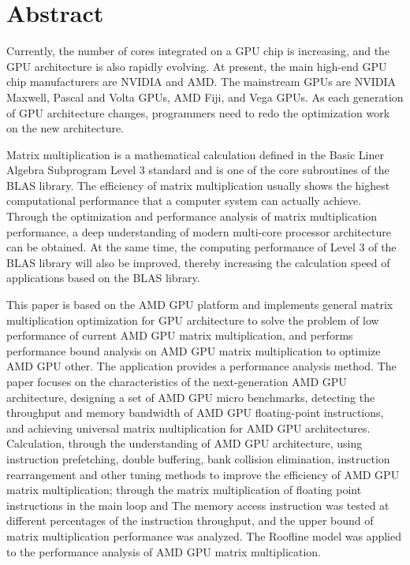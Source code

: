 \chapter*{Abstract}%

Currently, the number of cores integrated on a GPU chip is increasing, and the GPU architecture is also rapidly evolving. At present, the main high-end GPU chip manufacturers are NVIDIA and AMD. The mainstream GPUs are NVIDIA Maxwell, Pascal and Volta GPUs, AMD Fiji, and Vega GPUs. As each generation of GPU architecture changes, programmers need to redo the optimization work on the new architecture.

Matrix multiplication is a mathematical calculation defined in the Basic Liner Algebra Subprogram Level 3 standard and is one of the core subroutines of the BLAS library. The efficiency of matrix multiplication usually shows the highest computational performance that a computer system can actually achieve. Through the optimization and performance analysis of matrix multiplication performance, a deep understanding of modern multi-core processor architecture can be obtained. At the same time, the computing performance of Level 3 of the BLAS library will also be improved, thereby increasing the calculation speed of applications based on the BLAS library.

This paper is based on the AMD GPU platform and implements general matrix multiplication optimization for GPU architecture to solve the problem of low performance of current AMD GPU matrix multiplication, and performs performance bound analysis on AMD GPU matrix multiplication to optimize AMD GPU other. The application provides a performance analysis method. The paper focuses on the characteristics of the next-generation AMD GPU architecture, designing a set of AMD GPU micro benchmarks, detecting the throughput and memory bandwidth of AMD GPU floating-point instructions, and achieving universal matrix multiplication for AMD GPU architectures. Calculation, through the understanding of AMD GPU architecture, using instruction prefetching, double buffering, bank collision elimination, instruction rearrangement and other tuning methods to improve the efficiency of AMD GPU matrix multiplication; through the matrix multiplication of floating point instructions in the main loop and The memory access instruction was tested at different percentages of the instruction throughput, and the upper bound of matrix multiplication performance was analyzed. The Roofline model was applied to the performance analysis of AMD GPU matrix multiplication.


